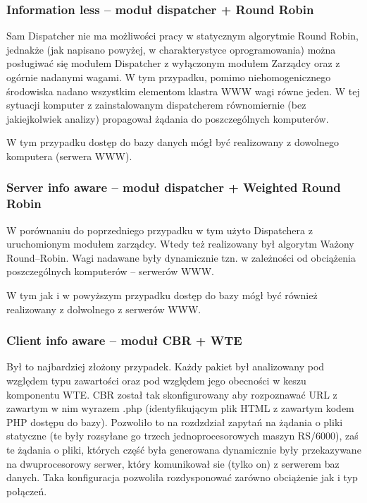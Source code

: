 \subsubsection{Information less -- moduł dispatcher + Round Robin}

Sam Dispatcher nie ma możliwości pracy w statycznym algorytmie Round Robin, jednakże (jak napisano powyżej, w charakterystyce 
oprogramowania) można posługiwać się modułem Dispatcher z wyłączonym modułem Zarządcy oraz z ogórnie nadanymi wagami. W tym
przypadku, pomimo niehomogenicznego środowiska nadano wszystkim elementom klastra WWW wagi równe jeden. W tej sytuacji komputer
z zainstalowanym dispatcherem równomiernie (bez jakiejkolwiek analizy) propagował żądania do poszczególnych komputerów.

W tym przypadku dostęp do bazy danych mógł być realizowany z dowolnego komputera (serwera WWW).

\subsubsection{Server info aware -- moduł dispatcher + Weighted Round Robin}

W porównaniu do poprzedniego przypadku w tym użyto Dispatchera z uruchomionym modułem zarządcy. Wtedy też realizowany był
algorytm Ważony Round--Robin. Wagi nadawane były dynamicznie tzn. w zależności od obciążenia poszczególnych komputerów -- 
serwerów WWW. 

W tym jak i w powyższym przypadku dostęp do bazy mógł być również realizowany z dolwolnego z serwerów WWW.

\subsubsection{Client info aware -- moduł CBR + WTE}

Był to najbardziej złożony przypadek. Każdy pakiet był analizowany pod względem typu zawartości oraz pod względem jego 
obecności w keszu komponentu WTE. CBR został tak skonfigurowany aby rozpoznawać URL z zawartym w nim wyrazem .php 
(identyfikującym plik HTML z zawartym kodem PHP dostępu do bazy). Pozwoliło to na rozdzdział zapytań na żądania o pliki
statyczne (te były rozsyłane go trzech jednoprocesorowych maszyn RS/6000), zaś te żądania o pliki, których część była
generowana dynamicznie były przekazywane na dwuprocesorowy serwer, który komunikował sie (tylko on) z serwerem baz danych.
Taka konfiguracja pozwoliła rozdysponować zarówno obciążenie jak i typ połączeń.

